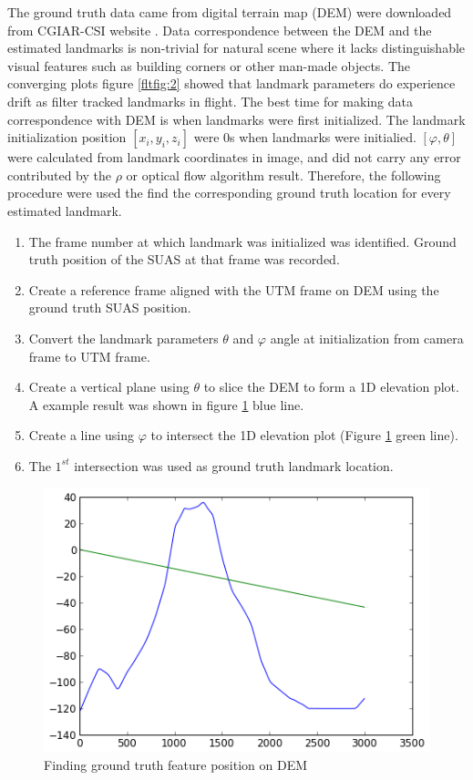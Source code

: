 The ground truth data came from digital terrain map (DEM) were
downloaded from CGIAR-CSI website \cite{_cgiar-csi_????}. Data
correspondence between the DEM and the estimated landmarks is
non-trivial for natural scene where it lacks distinguishable visual
features such as building corners or other man-made objects. The
converging plots figure \ref{fltfig:2} showed that landmark parameters
do experience drift as filter tracked landmarks in flight. The best
time for making data correspondence with DEM is when landmarks were
first initialized. The landmark initialization position $[x_i, y_i,
z_i]$ were 0s when landmarks were initialied. $[\varphi,
\theta]$ were calculated from landmark coordinates in image, and did
not carry any error contributed by the $\rho$ or optical flow
algorithm result. Therefore, the following procedure were used the find
the corresponding ground truth location for every estimated landmark.

\begin{enumerate}
  \item The frame number at which landmark was initialized was
  identified. Ground truth position of the SUAS at that frame was
  recorded.
  \item Create a reference frame aligned with the UTM frame on DEM
  using the ground truth SUAS position.
  \item Convert the landmark parameters $\theta$ and $\varphi$
  angle at initialization from camera frame to UTM frame. 
  \item Create a vertical plane using $\theta$ to slice the DEM to
  form a 1D elevation plot. A example result was shown in figure
  \ref{fltfig:7} blue line.
  \item Create a line using $\varphi$ to intersect the 1D elevation plot
  (Figure \ref{fltfig:7} green line). 
  \item The $1^{st}$ intersection was used as ground truth landmark
  location.
\end{enumerate}

\begin{figure}[h]
\centering
\includegraphics[width=12cm, keepaspectratio=true]
{./Figures/fltfig/cut1/intersect0_0.png}
\caption{Finding ground truth feature position on DEM}
\label{fltfig:7}
\end{figure}

